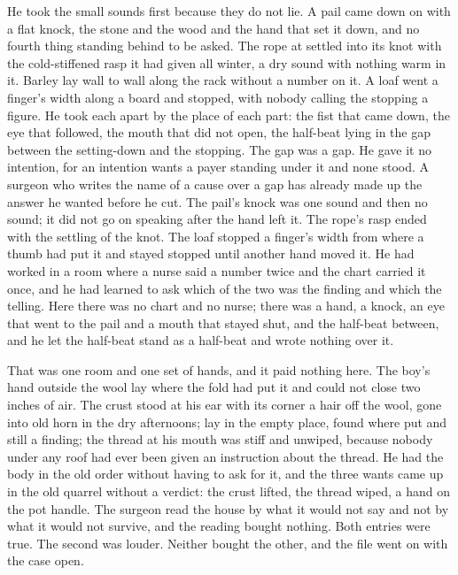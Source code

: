 He took the small sounds first because they do not lie. A pail came down on  with a flat knock, the stone and the wood and the hand that set it down, and no fourth thing standing behind to be asked. The rope at  settled into its knot with the cold-stiffened rasp it had given all winter, a dry sound with nothing warm in it. Barley lay wall to wall along the rack without a number on it. A loaf went a finger's width along a board and stopped, with nobody calling the stopping a figure. He took each apart by the place of each part: the fist that came down, the eye that followed, the mouth that did not open, the half-beat lying in the gap between the setting-down and the stopping. The gap was a gap. He gave it no intention, for an intention wants a payer standing under it and none stood. A surgeon who writes the name of a cause over a gap has already made up the answer he wanted before he cut. The pail's knock was one sound and then no sound; it did not go on speaking after the hand left it. The rope's rasp ended with the settling of the knot. The loaf stopped a finger's width from where a thumb had put it and stayed stopped until another hand moved it. He had worked in a room where a nurse said a number twice and the chart carried it once, and he had learned to ask which of the two was the finding and which the telling. Here there was no chart and no nurse; there was a hand, a knock, an eye that went to the pail and a mouth that stayed shut, and the half-beat between, and he let the half-beat stand as a half-beat and wrote nothing over it.

That was one room and one set of hands, and it paid nothing here. The boy's hand outside the wool lay where the fold had put it and could not close two inches of air. The crust stood at his ear with its corner a hair off the wool, gone into old horn in the dry afternoons;  lay in the empty place, found where put and still a finding; the thread at his mouth was stiff and unwiped, because nobody under any roof had ever been given an instruction about the thread. He had the body in the old order without having to ask for it, and the three wants came up in the old quarrel without a verdict: the crust lifted, the thread wiped, a hand on the pot handle. The surgeon read the house by what it would not say and not by what it would not survive, and the reading bought nothing. Both entries were true. The second was louder. Neither bought the other, and the file went on with the case open.

